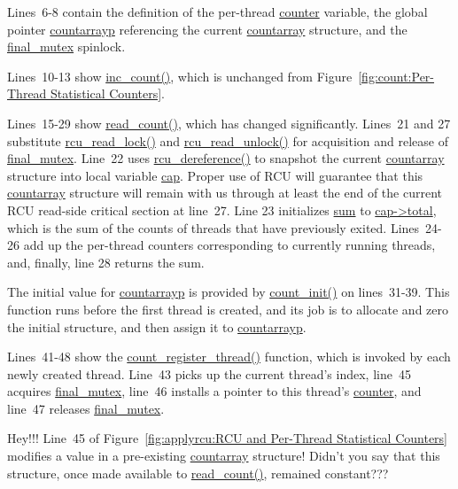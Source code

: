 Lines~6-8 contain the definition of the per-thread \url{counter}
variable, the global pointer \url{countarrayp} referencing
the current \url{countarray} structure, and
the \url{final_mutex} spinlock.

Lines~10-13 show \url{inc_count()}, which is unchanged from
Figure~\ref{fig:count:Per-Thread Statistical Counters}.

Lines~15-29 show \url{read_count()}, which has changed significantly.
Lines~21 and 27 substitute \url{rcu_read_lock()} and
\url{rcu_read_unlock()} for acquisition and release of \url{final_mutex}.
Line~22 uses \url{rcu_dereference()} to snapshot the
current \url{countarray} structure into local variable \url{cap}.
Proper use of RCU will guarantee that this \url{countarray} structure
will remain with us through at least the end of the current RCU
read-side critical section at line~27.
Line 23 initializes \url{sum} to \url{cap->total}, which is the
sum of the counts of threads that have previously exited.
Lines~24-26 add up the per-thread counters corresponding to currently
running threads, and, finally, line 28 returns the sum.

The initial value for \url{countarrayp} is
provided by \url{count_init()} on lines~31-39.
This function runs before the first thread is created, and its job
is to allocate
and zero the initial structure, and then assign it to \url{countarrayp}.

Lines~41-48 show the \url{count_register_thread()} function, which
is invoked by each newly created thread.
Line~43 picks up the current thread's index, line~45 acquires
\url{final_mutex}, line~46 installs a pointer to this thread's
\url{counter}, and line~47 releases \url{final_mutex}.

\QuickQuiz{}
	Hey!!!
	Line~45 of
	Figure~\ref{fig:applyrcu:RCU and Per-Thread Statistical Counters}
	modifies a value in a pre-existing \url{countarray} structure!
	Didn't you say that this structure, once made available to
	\url{read_count()}, remained constant???
 \QuickQuizEnd

